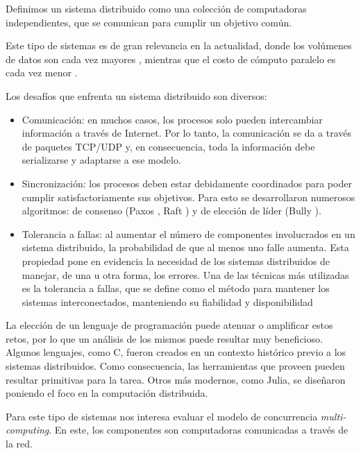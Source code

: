 \documentclass[11pt]{article}
\newcommand{\english}[1]{\textit{#1}}
\begin{document}
Definimos un sistema distribuido como una colección de computadoras independientes, que se comunican para cumplir un objetivo común.

Este tipo de sistemas es de gran relevancia en la actualidad, donde los volúmenes de datos son cada vez mayores \cite{sis_dist:data_volume}, mientras que el costo de cómputo paralelo es cada vez menor \cite{sis_dist:compute_price}.

Los desafíos que enfrenta un sistema distribuido son diversos:

\begin{itemize}
    \item Comunicación: en muchos casos, los procesos solo pueden intercambiar información a través de Internet. Por lo tanto, la comunicación se da a través de paquetes TCP/UDP y, en consecuencia, toda la información debe serializarse y adaptarse a ese modelo.

    \item Sincronización: los procesos deben estar debidamente coordinados para poder cumplir satisfactoriamente sus objetivos. Para esto se desarrollaron numerosos algoritmos: de consenso (Paxos \cite{sis_dist:paxos}, Raft \cite{sis_dist:raft}) y de elección de líder (Bully \cite{sis_dist:bully}).
    \item Tolerancia a fallas: al aumentar el número de componentes involucrados en un sistema distribuido, la probabilidad de que al menos uno falle aumenta. %
    Esta propiedad pone en evidencia la necesidad de los sistemas distribuidos de manejar, de una u otra forma, los errores. Una de las técnicas más utilizadas es la tolerancia a fallas, que se define como el método para mantener los sistemas interconectados, manteniendo su fiabilidad y disponibilidad \cite{sis_dist:fault_tol}
\end{itemize}

La elección de un lenguaje de programación puede atenuar o amplificar estos retos, por lo que un análisis de los mismos puede resultar muy beneficioso. Algunos lenguajes, como C, fueron creados en un contexto histórico previo a los sistemas distribuidos. Como consecuencia, las herramientas que proveen pueden resultar primitivas para la tarea. Otros más modernos, como Julia, se diseñaron poniendo el foco en la computación distribuida.

Para este tipo de sistemas nos interesa evaluar el modelo de concurrencia \english{multi-computing}. En este, los componentes son computadoras comunicadas a través de la red.
\end{document}
